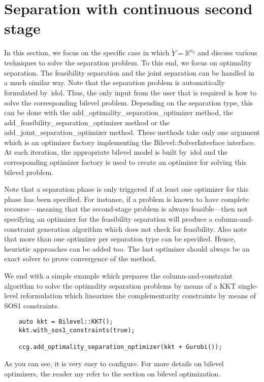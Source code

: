 \section{Separation with continuous second stage}
\label{sec:ccg:separation-continuous}

In this section, we focus on the specific case in which $\tilde{Y} =
\mathbb{R}^{n_y}$ and discuss various techniques to solve the separation
problem. To this end, we focus on optimality separation. The feasibility
separation and the joint separation can be handled in a much similar way. Note
that the separation problem is automatically formulated by~\textsf{idol}.
Thus, the only input from the user that is required is how to solve the
corresponding bilevel problem. Depending on the separation type, this can be
done with the \textsf{add\_optimality\_separation\_optimizer} method, the
\textsf{add\_feasibility\_separation\_optimizer} method or the
\textsf{add\_joint\_separation\_optimizer} method. These methods take only one
argument which is an optimizer factory implementing the
\textsf{Bilevel::SolverInterface} interface. At each iteration, the
appropriate bilevel model is built by~\textsf{idol} and the corresponding
optimizer factory is used to create an optimizer for solving this bilevel
problem.

Note that a separation phase is only triggered if at least one optimizer for
this phase has been specified. For instance, if a problem is known to have
complete recourse---meaning that the second-stage problem is always
feasible---then not specifying an optimizer for the feasibility separation
will produce a column-and-constraint generation algorithm which does not check
for feasibility. Also note that more than one optimizer per separation type
can be specified. Hence, heuristic approaches can be added too. The last
optimizer should always be an exact solver to prove convergence of the method.

We end with a simple example which prepares the column-and-constraint
algorithm to solve the optimality separation problems by means of a KKT
single-level reformulation which linearizes the complementarity constraints by
means of SOS1 constraints.
%
\begin{lstlisting}
    auto kkt = Bilevel::KKT();
    kkt.with_sos1_constraints(true);

    ccg.add_optimality_separation_optimizer(kkt + Gurobi());
\end{lstlisting}
As you can see, it is very easy to configure. For more details on bilevel
optimizers, the reader my refer to the section on bilevel optimization.


